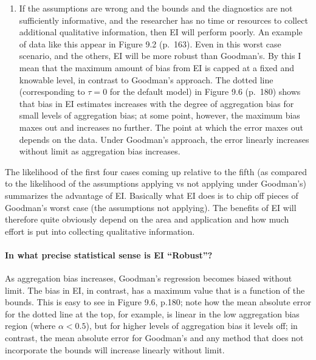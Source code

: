 \documentclass[11pt,titlepage]{article}
\begin{document}
\begin{enumerate}
\item If the assumptions are wrong and the bounds and the diagnostics
  are not sufficiently informative, and the researcher has no time or
  resources to collect additional qualitative information, then EI
  will perform poorly.  An example of data like this appear in Figure
  9.2 (p.\ 163).  Even in this worst case scenario, and the others, EI
  will be more robust than Goodman's.  By this I mean that the maximum
  amount of bias from EI is capped at a fixed and knowable level, in
  contrast to Goodman's approach.  The dotted line (corresponding to
  $\tau=0$ for the default model) in Figure 9.6 (p.\ 180) shows that
  bias in EI estimates increases with the degree of aggregation bias
  for small levels of aggregation bias; at some point, however, the
  maximum bias maxes out and increases no further.  The point at which
  the error maxes out depends on the data.  Under Goodman's approach,
  the error linearly increases without limit as aggregation bias
  increases.
\end{enumerate}
The likelihood of the first four cases coming up relative to the fifth
(as compared to the likelihood of the assumptions applying vs not
applying under Goodman's) summarizes the advantage of EI.  Basically
what EI does is to chip off pieces of Goodman's worst case (the
assumptions not applying).  The benefits of EI will therefore quite
obviously depend on the area and application and how much effort is
put into collecting qualitative information.

\paragraph{In what precise statistical sense is EI ``Robust''?}
As aggregation bias increases, Goodman's regression becomes biased
without limit.  The bias in EI, in contrast, has a maximum value that
is a function of the bounds.  This is easy to see in Figure 9.6,
p.180; note how the mean absolute error for the dotted line at the
top, for example, is linear in the low aggregation bias region (where
$\alpha<0.5$), but for higher levels of aggregation bias it levels
off; in contrast, the mean absolute error for Goodman's and any method
that does not incorporate the bounds will increase linearly without
limit.  
\end{document}
